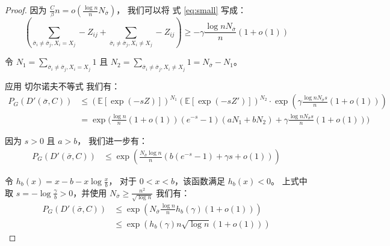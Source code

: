 \begin{proof}
	因为 $\frac{C}{\beta} n = o(\frac{\log n}{n} N_{\bar{\sigma}})$，
  我们可以将 式 \eqref{eq:small} 写成：
\begin{equation}
	\left( \sum_{\bar{\sigma}_i  \neq \bar{\sigma}_j, X_i = X_j} -Z_{ij}
	+ \sum_{\bar{\sigma}_i  \neq \bar{\sigma}_j, X_i \neq X_j} -Z_{ij} \right)\geq 
  -\gamma\frac{\log n N_{\bar{\sigma}}}{n}(1+o(1))
	\end{equation}
	
	令 $N_1 = \sum_{\bar{\sigma}_i  \neq \bar{\sigma}_j, X_i = X_j} 1$
	且 $N_2 = \sum_{\bar{\sigma}_i  \neq \bar{\sigma}_j, X_i \neq X_j} 1 = N_{\bar{\sigma}} - N_1$。
	
	应用 切尔诺夫不等式 我们有：
	\begin{align*}
	P_G(D'(\bar{\sigma}, C))&
	\leq (\mathbb{E}[\exp(-s Z )])^{N_1} (\mathbb{E}[\exp(-s Z' )])^{N_2} \cdot 
  \exp \left(\gamma \frac{\log n N_{\bar{\sigma}} s}{n}(1+o(1)) \right) \\
	&= \exp \Big( \frac{\log n}{n}(1+o(1))(e^{-s}-1)(aN_1 + bN_2) 
	+\gamma \frac{\log n N_{\bar{\sigma}} s}{n}(1+o(1))\Big)
	\end{align*}
	
	因为 $s > 0$ 且 $a>b$，
  我们进一步有：
	\begin{align*}
	P_G(D'(\bar{\sigma}, C))
	& \leq \exp \left( \frac{N_{\bar{\sigma}}\log n }{n}(b(e^{-s}-1)+ \gamma s + o(1)) \right) 
	\end{align*}
	
	令 $h_b(x) = x - b -x\log \frac{x}{b}$，
  对于 $0<x<b$，该函数满足  $h_b(x) < 0$。
	上式中取 $s=-\log\frac{\gamma}{b} > 0$，并使用
	$N_{\bar{\sigma}} \geq \frac{n^2}{\sqrt{\log n}}$ 我们有：
	\begin{align*}
	P_G(D'(\bar{\sigma}, C))&\leq \exp( N_{\bar{\sigma}} \frac{\log n}{n} h_b(\gamma)(1+o(1))) \\
	& \leq \exp (h_b(\gamma) n \sqrt{\log n} (1+o(1)))
	\end{align*}
\end{proof}

